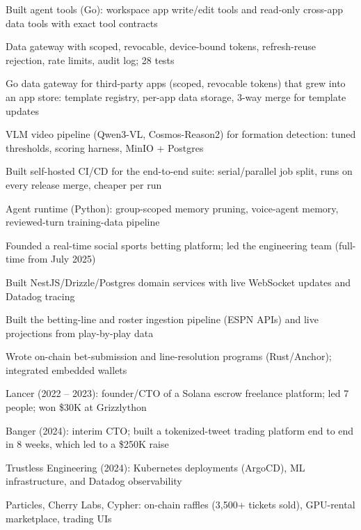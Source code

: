 \documentclass[print]{jack-resume}
\begin{document}
\begin{tightemize}
    \item Built agent tools (Go): workspace app write/edit tools and read-only cross-app data tools with exact tool contracts
    \item Data gateway with scoped, revocable, device-bound tokens, refresh-reuse rejection, rate limits, audit log; 28 tests
    \item Go data gateway for third-party apps (scoped, revocable tokens) that grew into an app store: template registry, per-app data storage, 3-way merge for template updates
    \item VLM video pipeline (Qwen3-VL, Cosmos-Reason2) for formation detection: tuned thresholds, scoring harness, MinIO + Postgres
    \item Built self-hosted CI/CD for the end-to-end suite: serial/parallel job split, runs on every release merge, cheaper per run
    \item Agent runtime (Python): group-scoped memory pruning, voice-agent memory, reviewed-turn training-data pipeline
\end{tightemize}
\sectionsep

\begin{tightemize}
    \item Founded a real-time social sports betting platform; led the engineering team (full-time from July 2025)
    \item Built NestJS/Drizzle/Postgres domain services with live WebSocket updates and Datadog tracing
    \item Built the betting-line and roster ingestion pipeline (ESPN APIs) and live projections from play-by-play data
    \item Wrote on-chain bet-submission and line-resolution programs (Rust/Anchor); integrated embedded wallets
\end{tightemize}
\sectionsep

\begin{tightemize}
    \item Lancer (2022 – 2023): founder/CTO of a Solana escrow freelance platform; led 7 people; won \$30K at Grizzlython
    \item Banger (2024): interim CTO; built a tokenized-tweet trading platform end to end in 8 weeks, which led to a \$250K raise
    \item Trustless Engineering (2024): Kubernetes deployments (ArgoCD), ML infrastructure, and Datadog observability
    \item Particles, Cherry Labs, Cypher: on-chain raffles (3,500+ tickets sold), GPU-rental marketplace, trading UIs
\end{tightemize}
\sectionsep
\end{document}
